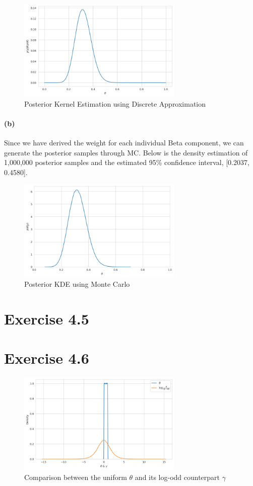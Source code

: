\documentclass[11pt, letterpaper]{article}
\begin{document}
\begin{figure}[!h]
  \centering
  \includegraphics[width=0.7\textwidth]{4.4.a.png}
  \captionsetup{justification=centering}
  \caption{Posterior Kernel Estimation using Discrete Approximation}
\end{figure}
\newpage

\paragraph{(b)}
Since we have derived the weight for each individual Beta component, we can generate the posterior samples through MC. Below is the density estimation of 1,000,000 posterior samples and the estimated 95\% confidence interval, [0.2037, 0.4580].

\begin{figure}[!h]
  \centering
  \includegraphics[width=0.7\textwidth]{4.4.b.png}
  \captionsetup{justification=centering}
  \caption{Posterior KDE using Monte Carlo}
\end{figure}


\section{Exercise 4.5}



\section{Exercise 4.6}
\begin{figure}[!h]
  \centering
  \includegraphics[width=0.7\textwidth]{4.6.png}
  \captionsetup{justification=centering}
  \caption{Comparison between the uniform $\theta$ and its log-odd counterpart $\gamma$}
\end{figure}
\end{document}
